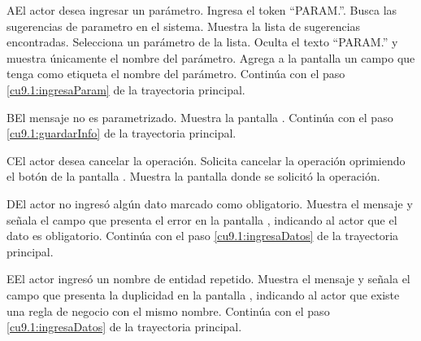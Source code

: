  
 \begin{UCtrayectoriaA}{A}{El actor desea ingresar un parámetro.}
 	 \UCpaso[\UCactor] Ingresa el token ``PARAM.''.
 	\UCpaso[\UCsist] Busca las sugerencias de parametro en el sistema. 
 	\UCpaso[\UCsist] Muestra la lista de sugerencias encontradas.
 	\UCpaso[\UCactor] Selecciona un parámetro de la lista.
  	\UCpaso[\UCsist] Oculta el texto ``PARAM.'' y muestra únicamente el nombre del parámetro.
  	\UCpaso[\UCsist] Agrega a la pantalla un campo que tenga como etiqueta el nombre del parámetro. 
    \UCpaso[] Continúa con el paso \ref{cu9.1:ingresaParam} de la trayectoria principal.
 \end{UCtrayectoriaA}
 \begin{UCtrayectoriaA}{B}{El mensaje no es parametrizado.}
	\UCpaso[\UCsist] Muestra la pantalla .
	\UCpaso[] Continúa con el paso \ref{cu9.1:guardarInfo} de la trayectoria principal.
 \end{UCtrayectoriaA} 
 \begin{UCtrayectoriaA}{C}{El actor desea cancelar la operación.}
    \UCpaso[\UCactor] Solicita cancelar la operación oprimiendo el botón  de la pantalla .
    \UCpaso[\UCsist] Muestra la pantalla donde se solicitó la operación.
 \end{UCtrayectoriaA}
 \begin{UCtrayectoriaA}{D}{El actor no ingresó algún dato marcado como obligatorio.}
    \UCpaso[\UCsist] Muestra el mensaje  y señala el campo que presenta el error en la pantalla 
	    , indicando al actor que el dato es obligatorio.
    \UCpaso[] Continúa con el paso \ref{cu9.1:ingresaDatos} de la trayectoria principal.
 \end{UCtrayectoriaA}
 \begin{UCtrayectoriaA}{E}{El actor ingresó un nombre de entidad repetido.}
    \UCpaso[\UCsist] Muestra el mensaje  y señala el campo que presenta la duplicidad en la pantalla 
	    , indicando al actor que existe una regla de negocio con el mismo nombre.
    \UCpaso[] Continúa con el paso \ref{cu9.1:ingresaDatos} de la trayectoria principal.
 \end{UCtrayectoriaA}
 
